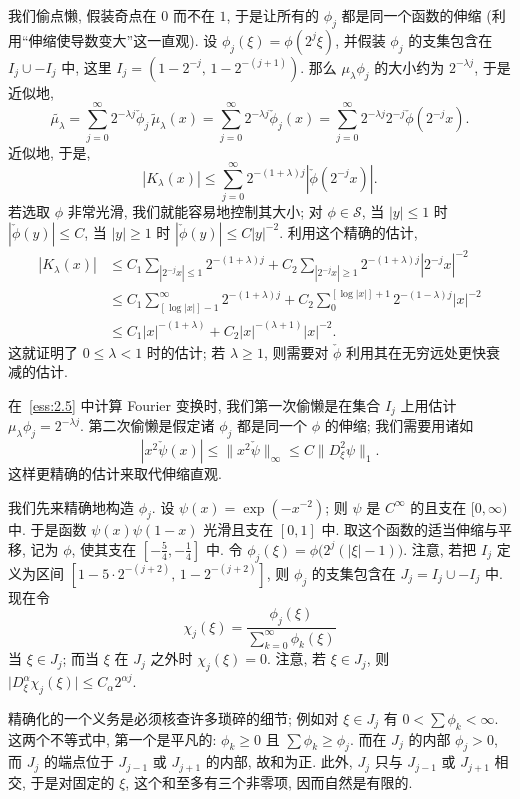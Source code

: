 我们偷点懒, 假装奇点在 $0$ 而不在 $1$, 于是让所有的 $\phi_j$ 都是同一个函数的伸缩 (利用``伸缩使导数变大''这一直观). 设 $\phi_j(\xi)=\phi(2^j\xi)$, 并假装 $\phi_j$ 的支集包含在 $I_j\cup-I_j$ 中, 这里 $I_j=(1-2^{-j},\,1-2^{-(j+1)})$. 那么 $\mu_\lambda\phi_j$ 的大小约为 $2^{-\lambda j}$, 于是近似地,
\[
\widetilde{\mu_{\lambda}}=\sum_{j=0}^{\infty}2^{-\lambda j}\check{\phi}_{j}\,\widetilde{\mu}_{\lambda}(x)=\sum_{j=0}^{\infty}2^{-\lambda j}\check{\phi}_{j}(x)=\sum_{j=0}^{\infty}2^{-\lambda j}2^{-j}\check{\phi}(2^{-j}x).
\]
近似地, 于是,
\[
|K_{\lambda}(x)|\leq\sum_{j=0}^{\infty}2^{-(1+\lambda)j}|\check{\phi}(2^{-j}x)|.
\]
若选取 $\phi$ 非常光滑, 我们就能容易地控制其大小; 对 $\phi\in\mathcal{S}$, 当 $|y|\leq 1$ 时 $|\check{\phi}(y)|\leq C$, 当 $|y|\geq 1$ 时 $|\check{\phi}(y)|\leq C|y|^{-2}$. 利用这个精确的估计,
\begin{align*}
|K_{\lambda}(x)|&\leq C_{1}\sum_{|2^{-j}x|\leq1}2^{-(1+\lambda)j}+C_{2}\sum_{|2^{-j}x|\geq1}2^{-(1+\lambda)j}|2^{-j}x|^{-2} \\
&\leq C_{1}\sum_{[\log|x|]-1}^{\infty}2^{-(1+\lambda)j}+C_{2}\sum_{0}^{[\log|x|]+1}2^{-(1-\lambda)j}|x|^{-2} \\
&\leq C_{1}|x|^{-(1+\lambda)}+C_{2}|x|^{-(\lambda+1)}|x|^{-2}.
\end{align*}
这就证明了 $0\leq\lambda<1$ 时的估计; 若 $\lambda\geq 1$, 则需要对 $\check{\phi}$ 利用其在无穷远处更快衰减的估计.


在~\ref*{ess:2.5} 中计算 Fourier 变换时, 我们第一次偷懒是在集合 $I_j$ 上用估计 $\mu_{\lambda}\phi_j=2^{-\lambda j}$. 第二次偷懒是假定诸 $\phi_j$ 都是同一个 $\phi$ 的伸缩; 我们需要用诸如
\[
|x^{2}\check{\psi}(x)|\leq\|x^{2}\check{\psi}\|_{\infty}\leq C\|D_{\xi}^{2}\psi\|_{1}.
\]
这样更精确的估计来取代伸缩直观.

我们先来精确地构造 $\phi_j$. 设 $\psi(x)=\exp(-x^{-2})$; 则 $\psi$ 是 $C^\infty$ 的且支在 $[0,\infty)$ 中. 于是函数 $\psi(x)\psi(1-x)$ 光滑且支在 $[0,1]$ 中. 取这个函数的适当伸缩与平移, 记为 $\phi$, 使其支在 $[-\frac{5}{4},-\frac{1}{4}]$ 中. 令 $\phi_j(\xi)=\phi\bigl(2^j(|\xi|-1)\bigr)$. 注意, 若把 $I_j$ 定义为区间 $[1-5\cdot 2^{-(j+2)},\,1-2^{-(j+2)}]$, 则 $\phi_j$ 的支集包含在 $J_j=I_j\cup-I_j$ 中. 现在令
\[
\chi_{j}(\xi)=\frac{\phi_{j}(\xi)}{\sum_{k=0}^{\infty}\phi_{k}(\xi)}
\]
当 $\xi\in J_j$; 而当 $\xi$ 在 $J_j$ 之外时 $\chi_j(\xi)=0$. 注意, 若 $\xi\in J_j$, 则 $\bigl|D_\xi^\alpha\chi_j(\xi)\bigr|\leq C_\alpha 2^{\alpha j}$.

精确化的一个义务是必须核查许多琐碎的细节; 例如对 $\xi\in J_j$ 有 $0<\sum\phi_k<\infty$. 这两个不等式中, 第一个是平凡的: $\phi_k\geq 0$ 且 $\sum\phi_k\geq\phi_j$. 而在 $J_j$ 的内部 $\phi_j>0$, 而 $J_j$ 的端点位于 $J_{j-1}$ 或 $J_{j+1}$ 的内部, 故和为正. 此外, $J_j$ 只与 $J_{j-1}$ 或 $J_{j+1}$ 相交, 于是对固定的 $\xi$, 这个和至多有三个非零项, 因而自然是有限的.

